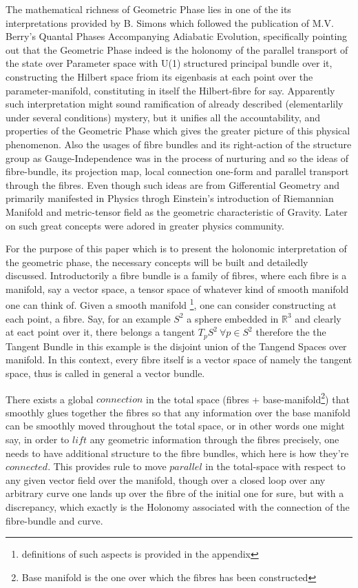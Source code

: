 \documentclass[8pt, twocoloumn]{article}
\begin{document}
The mathematical richness of Geometric Phase lies in one of the its interpretations provided by B. Simons which followed the publication of M.V. Berry's Quantal Phases Accompanying Adiabatic Evolution, specifically pointing out that the Geometric Phase indeed is the holonomy of the parallel transport of the state over Parameter space with U(1) structured principal bundle over it, constructing the Hilbert space friom its eigenbasis at each point over the parameter-manifold, constituting in itself the Hilbert-fibre for say. Apparently such interpretation might sound ramification of already described (elementarlily under several conditions) mystery, but it unifies all the accountability, and properties of the Geometric Phase which gives the greater picture of this physical phenomenon. Also the usages of fibre bundles and its right-action of the structure group as Gauge-Independence was in the process of nurturing and so the ideas of fibre-bundle, its projection map, local connection one-form and parallel transport through the fibres. Even though such ideas are from Gifferential Geometry and primarily manifested in Physics throgh Einstein's introduction of Riemannian Manifold and metric-tensor field as the geometric characteristic of Gravity. Later on such great concepts were adored in greater physics community. 

For the purpose of this paper which is to present the holonomic interpretation of the geometric phase, the necessary concepts will be built and detailedly discussed. Introductorily a fibre bundle is a family of fibres, where each fibre is a manifold, say a vector space, a tensor space of whatever kind of smooth manifold one can think of. Given a smooth manifold \footnote{definitions of such aspects is provided in the appendix}, one can consider constructing at each point, a fibre. Say, for an example $S^2$ a sphere embedded in $\mathbb{R}^3$ and clearly at eact point over it, there belongs a tangent $T_p S^2 \ \forall p \in S^2$ therefore the the Tangent Bundle in this example is the disjoint union of the Tangend Spaces over manifold. In this context, every fibre itself is a vector space of namely the tangent space, thus is called in general a vector bundle. 

There exists a global $connection$ in the total space (fibres + base-manifold\footnote{Base manifold is the one over which the fibres has been constructed}) that smoothly glues together the fibres so that any information over the base manifold can be smoothly moved throughout the total space, or in other words one might say, in order to $lift$ any geometric information through the fibres precisely, one needs to have additional structure to the fibre bundles, which here is how they're $connected$. This provides rule to move $parallel$ in the total-space with respect to any given vector field over the manifold, though over a closed loop over any arbitrary curve one lands up over the fibre of the initial one for sure, but with a discrepancy, which exactly is the Holonomy associated with the connection of the fibre-bundle and curve. 
\end{document}
